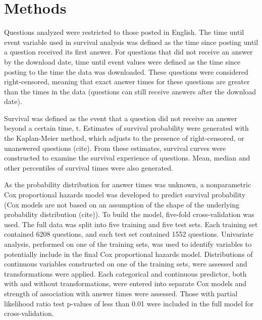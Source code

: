 \documentclass{article}
\begin{document}
\section*{Methods}



Questions analyzed were restricted to those posted in English. The time until event variable used in survival analysis was defined as the time since posting until a question received its first answer. For questions that did not receive an answer by the download date, time until event values were defined as the time since posting to the time the data was downloaded. These questions were considered right-censored, meaning that exact answer times for these questions are greater than the times in the data (questions can still receive answers after the download date). 

Survival was defined as the event that a question did not receive an answer beyond a certain time, t. Estimates of survival probability were generated with the Kaplan-Meier method, which adjusts to the presence of right-censored, or unanswered questions (cite). From these estimates, survival curves were constructed to examine the survival experience of questions. Mean, median and other percentiles of survival times were also generated. 

As the probability distribution for answer times was unknown, a nonparametric Cox proportional hazards model was developed to predict survival probability (Cox models are not based on an assumption of the shape of the underlying probability distribution (cite)). To build the model, five-fold cross-validation was used. The full data was split into five training and five test sets. Each training set contained 6208 questions, and each test set contained 1552 questions. Univariate analysis, performed on one of the training sets, was used to identify variables to potentially include in the final Cox proportional hazards model. Distributions of continuous variables constructed on one of the training sets, were assessed and transformations were applied. Each categorical and continuous predictor, both with and without transformations, were entered into separate Cox models and strength of association with answer times were assessed. Those with partial likelihood ratio test p-values of less than 0.01 were included in the full model for cross-validation.
\end{document}
